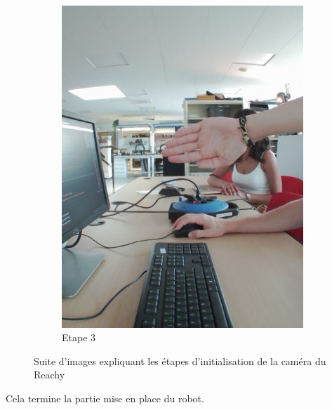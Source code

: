 \documentclass[a4paper,french]{article}
\begin{document}
\begin{figure}[!ht]
\begin{subfigure}{0.25\textwidth}
        \includegraphics[width=\textwidth]{figures/etape3.png}
        \caption{Etape 3}
        \label{subfig:etape3}
    \end{subfigure}
    \caption{Suite d'images expliquant les étapes d'initialisation de la caméra du Reachy}
\end{figure}

Cela termine la partie mise en place du robot.
\end{document}
